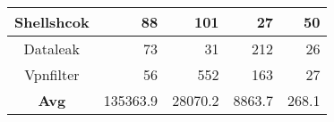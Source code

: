 \begin{tabular}{crrrr}
\rowcolor[HTML]{C0C0C0} 
Shellshcok                 & 88                                                             & 101                                                              & 27                                                          & 50                                                                 \\ \hline
Dataleak                   & 73                                                             & 31                                                               & 212                                                         & 26                                                                 \\ \hline
\rowcolor[HTML]{C0C0C0} 
Vpnfilter                  & 56                                                             & 552                                                              & 163                                                         & 27                                                                 \\ \hline
\textbf{Avg}               & 135363.9                                                       & 28070.2                                                          & 8863.7                                                      & 268.1                                                             
\end{tabular}
